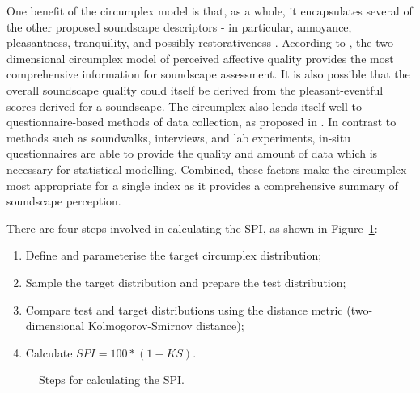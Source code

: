\documentclass[
  authoryear,
  preprint,
  3p]{elsarticle}
\providecommand{\tightlist}{%
  \setlength{\itemsep}{0pt}\setlength{\parskip}{0pt}}\usepackage{longtable,booktabs,array}
\begin{document}
One benefit of the circumplex model is that, as a whole, it encapsulates
several of the other proposed soundscape descriptors - in particular,
annoyance, pleasantness, tranquility, and possibly restorativeness
\citep{Aletta2016Soundscape}. According to \citet{Axelsson2015How}, the
two-dimensional circumplex model of perceived affective quality provides
the most comprehensive information for soundscape assessment. It is also
possible that the overall soundscape quality could itself be derived
from the pleasant-eventful scores derived for a soundscape. The
circumplex also lends itself well to questionnaire-based methods of data
collection, as proposed in \citet{ISO12913Part2}. In contrast to methods
such as soundwalks, interviews, and lab experiments, in-situ
questionnaires are able to provide the quality and amount of data which
is necessary for statistical modelling. Combined, these factors make the
circumplex most appropriate for a single index as it provides a
comprehensive summary of soundscape perception.

There are four steps involved in calculating the SPI, as shown in
Figure~\ref{fig-bespoke-spi}:

\begin{enumerate}
\def\labelenumi{\arabic{enumi}.}
\tightlist
\item
  Define and parameterise the target circumplex distribution;
\item
  Sample the target distribution and prepare the test distribution;
\item
  Compare test and target distributions using the distance metric
  (two-dimensional Kolmogorov-Smirnov distance);
\item
  Calculate \(SPI = 100 * (1 - KS)\).
\end{enumerate}

\begin{figure}


\caption{\label{fig-bespoke-spi}Steps for calculating the SPI.}

\end{figure}%
\end{document}
